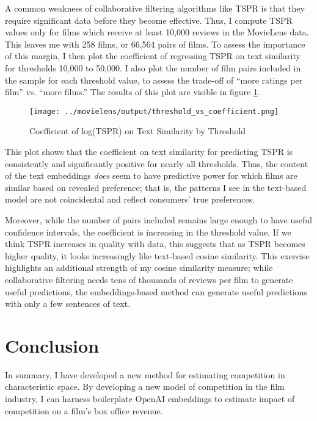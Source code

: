 \documentclass{article}
\begin{document}
A common weakness of collaborative filtering algorithms like TSPR is that they require significant data before they become effective. Thus, I compute TSPR values only for films which receive at least 10,000 reviews in the MovieLens data. This leaves me with 258 films, or 66,564 pairs of films. To assess the importance of this margin, I then plot the coefficient of regressing TSPR on text similarity for thresholds 10,000 to 50,000. I also plot the number of film pairs included in the sample for each threshold value, to assess the trade-off of ``more ratings per film'' vs. ``more films.'' The results of this plot are visible in figure \ref{fig:tspr_threshold}. 

\begin{figure}
    \begin{center}
    \texttt{[image: ../movielens/output/threshold\_vs\_coefficient.png]}
    \caption{Coefficient of log(TSPR) on Text Similarity by Threshold}
    \label{fig:tspr_threshold}
    \end{center}
\end{figure}

This plot shows that the coefficient on text similarity for predicting TSPR is consistently and significantly positive for nearly all thresholds. Thus, the content of the text embeddings \emph{does} seem to have predictive power for which films are similar based on revealed preference; that is, the patterns I see in the text-based model are not coincidental and reflect consumers' true preferences. 

Moreover, while the number of pairs included remains large enough to have useful confidence intervals, the coefficient is increasing in the threshold value. If we think TSPR increases in quality with data, this suggests that as TSPR becomes higher quality, it looks increasingly like text-based cosine similarity. This exercise highlights an additional strength of my cosine similarity measure; while collaborative filtering needs tens of thousands of reviews per film to generate useful predictions, the embeddings-based method can generate useful predictions with only a few sentences of text.


\section{Conclusion}

In summary, I have developed a new method for estimating competition in characteristic space. By developing a new model of competition in the film industry, I can harness boilerplate OpenAI embeddings to estimate impact of competition on a film's box office revenue. 
\end{document}
